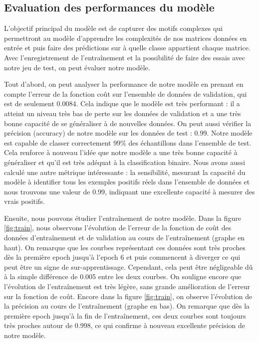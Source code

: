 \documentclass[11pt, parskip=half]{scrartcl} %
\begin{document}
\subsection{Evaluation des performances du modèle}
L’objectif principal du modèle est de capturer des motifs complexes qui permettront au modèle d’apprendre les complexités de nos matrices données en entrée et puis faire des prédictions sur à quelle classe appartient chaque matrice. Avec l’enregistrement de l’entraînement et la possibilité de faire des essais avec notre jeu de test, on peut évaluer notre modèle.

Tout d’abord, on peut analyser la performance de notre modèle en prenant en compte l’erreur de la fonction coût sur l’ensemble de données de validation, qui est de seulement  0.0084. Cela indique que le modèle est très performant : il a atteint un niveau très bas de perte sur les données de validation et a une très bonne capacité de se généraliser à de nouvelles données. On peut aussi vérifier la précision (accuracy) de notre modèle sur les données de test : 0.99. Notre modèle est capable de classer correctement 99\% des échantillons dans l’ensemble de test. Cela renforce à nouveau l’idée que notre modèle a une très bonne capacité à généraliser et qu’il est très adéquat à la classification binaire. Nous avons aussi calculé une autre métrique intéressante : la sensibilité, mesurant la capacité du modèle à identifier tous les exemples positifs réels dans l'ensemble de données et nous trouvons une valeur de 0.99, indiquant une excellente capacité à mesurer des vrais positifs.

Ensuite, nous pouvons étudier l’entraînement de notre modèle. Dans la figure \ref{fig:train}, nous observons l’évolution de l’erreur de la fonction de coût des données d’entraînement et de validation au cours de l’entraînement (graphe en haut). On remarque que les courbes représentant ces données sont très proches dès la première epoch jusqu’à l’epoch 6 et puis commencent à diverger ce qui peut être un signe de sur-apprentissage. Cependant, cela peut être négligeable dû à la simple différence de 0.005 entre les deux courbes. On souligne encore que l’évolution de l’entraînement est très légère, sans grande amélioration de l’erreur sur la fonction de coût. Encore dans la figure \ref{fig:train}, on observe l’évolution de la précision au cours de l’entraînement (graphe en bas). On remarque que dès la première epoch jusqu’à la fin de l’entraînement, ces deux courbes sont toujours très proches autour de 0.998, ce qui confirme à nouveau excellente précision de notre modèle.
\end{document}
